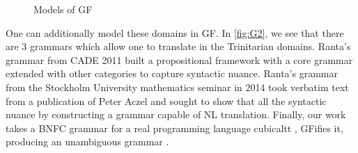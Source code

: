 
\begin{figure}[H]
\centering
{}
\caption{Models of GF} \label{fig:G1}
\end{figure}

One can additionally model these domains in GF. In \autoref{fig:G2}, we see that
there are 3 grammars which allow one to translate in the Trinitarian domains. Ranta's
grammar from CADE 2011 \cite{rantaLog} built a propositional framework with a core grammar
extended with other categories to capture syntactic nuance. Ranta's grammar from
the Stockholm University mathematics seminar in 2014 \cite{aarneHott} took verbatim text from a
publication of Peter Aczel and sought to show that all the syntactic nuance by
constructing a grammar capable of NL translation. Finally, our work takes a BNFC
grammar for a real programming language cubicaltt \cite{cubicaltt}, GFifies it,
producing an unambiguous grammar \cite{warrickCub}.

